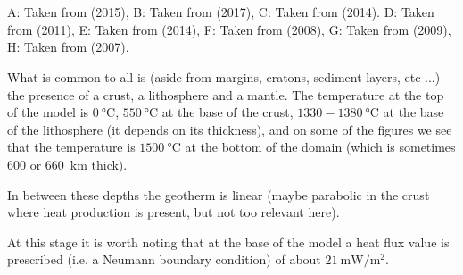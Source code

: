 \begin{center}
\\
\\
{\captionfont 
A: Taken from \textcite{albe15} (2015),
B: Taken from \textcite{bube17} (2017),
C: Taken from \textcite{bubj14} (2014).
D: Taken from \textcite{hube11} (2011),
E: Taken from \textcite{hube14} (2014),
F: Taken from \textcite{wabj08} (2008),
G: Taken from \textcite{bejb09} (2009),
H: Taken from \textcite{cubh07} (2007).}
\end{center}

What is common to all is (aside from margins, cratons, sediment layers, etc ...) the presence 
of a crust, a lithosphere and a mantle. 
The temperature at the top of the model is $0~\si{\celsius}$, $550~\si{\celsius}$ at the base of the 
crust, $1330-1380~\si{\celsius}$ at the base of the lithosphere (it depends on its thickness), 
and on some of the figures we see that the temperature is $1500~\si{\celsius}$ at the bottom of the 
domain (which is sometimes 600 or 660~\si{\km} thick).

In between these depths the geotherm is linear (maybe parabolic in the crust where heat production
is present, but not too relevant here).

At this stage it is worth noting that at the base of the model a heat flux value is prescribed
(i.e. a Neumann boundary condition) of about $21~\si{\milli\watt\per\square\meter}$.

